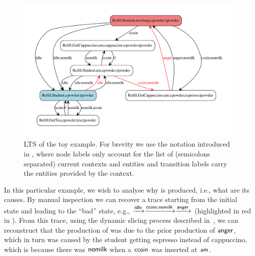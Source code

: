 \begin{figure}
\includegraphics[scale=.3]{./figs/toylts-traced}
\caption{LTS of the toy example. For brevity we use the notation introduced in , where node labels only account for the list of (semicolons separated) current contexts and entities and transition labels carry the entities provided by the context.\label{fig:toylts}}
\end{figure}

In this particular example, we wish to analyse why \bang is produced, i.e., what are its causes. By manual inspection we can recover a trace starting from the initial state and leading to the ``bad'' state, e.g., $\xrightarrow{{\text{\sffamily idle}}}\xrightarrow{{\text{\sffamily ccoin}};{\text{\sffamily nomilk}}}\xrightarrow{{\text{\sffamily anger}}}$ (highlighted in red in ). 
From this trace, using the dynamic slicing process described in~\cite{DBLP:journals/nc/BrodoBF24}, we can reconstruct that the production of \bang was due to the prior production of ${\text{\sffamily anger}}$, which in turn was caused by the student getting espresso instead of cappuccino, which is because there was ${\text{\sffamily nomilk}}$ when a ${\text{\sffamily ccoin}}$ was inserted at ${\text{\sffamily am}}$.
